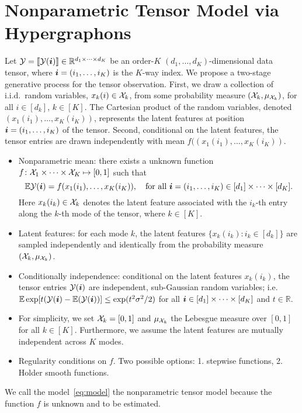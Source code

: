 \documentclass{article}
\theoremstyle{plain}
\theoremstyle{definition}
\begin{document}
\section{Nonparametric Tensor Model via Hypergraphons}\label{sec:model}
Let $\mathcal{Y}=\llbracket \mathcal{Y}(\bm{i}) \rrbracket\in\mathbb{R}^{d_1\times \cdots \times d_K}$ be an order-$K$ $(d_1,\ldots,d_K)$-dimensional data tensor, where $\bm{i}=(i_1,\ldots,i_K)$ is the $K$-way index. We propose a two-stage generative process for the tensor observation. First, we draw a collection of i.i.d.\ random variables, $x_k(i) \in \mathcal{X}_k$, from some probability measure $(\mathcal{X}_k,\mu_{\mathcal{X}_k})$, for all $i\in[d_k]$, $k\in[K]$. The Cartesian product of the random variables, denoted $(x_1(i_1),\ldots,x_K(i_K))$, represents the latent features at position $\bm{i}=(i_1,\dots,i_K)$ of the tensor. Second, conditional on the latent features, the tensor entries are drawn independently with mean $f((x_1(i_1),\ldots,x_K(i_K))$.
\begin{itemize}[label=\textbullet, leftmargin=*]
\item Nonparametric mean: there exists a unknown function $f\colon \mathcal{X}_1\times \cdots \times \mathcal{X}_K \mapsto [0,1]$ such that
\begin{equation}\label{eq:model}
\mathbb{E}\tY(\mi) =f(x_1(i_1),\ldots,x_K(i_K)),\quad \text{for all}\ \mi=(i_1,\ldots,i_K)\in[d_1]\times \cdots \times [d_K].
\end{equation}
Here $x_k(i_k)\in\mathcal{X}_k$ denotes the latent feature associated with the $i_k$-th entry along the $k$-th mode of the tensor, where $k\in[K]$.  
\item Latent features: for each mode $k$, the latent features $\{x_k(i_k)\colon i_k\in[d_k]\}$ are sampled independently and identically from the probability measure $(\mathcal{X}_k,\mu_{\mathcal{X}_k})$.
\item Conditionally independence: conditional on the latent features $x_k(i_k)$, the tensor entries $\mathcal{Y}(\bm{i})$ are independent, sub-Gaussian random variables; i.e. $\mathbb{E}\exp [t(\mathcal{Y}(\bm{i})-\mathbb{E}(\mathcal{Y}(\bm{i}))] \leq \exp(t^2\sigma^2/2)$ for all $\bm{i}\in[d_1]\times \cdots \times[d_K]$ and $t\in\mathbb{R}$.

\item For simplicity, we set $\mathcal{X}_k=[0,1]$ and $\mu_{\mathcal{X}_k}$ the Lebesgue measure over $[0,1]$ for all $k\in[K]$. Furthermore, we assume the latent features are mutually independent across $K$ modes.
\item Regularity conditions on $f$. Two possible options: 1. stepwise functions, 2. Holder smooth functions.
\end{itemize}
We call the model~\eqref{eq:model} the nonparametric tensor model because the function $f$ is unknown and to be estimated. 
\end{document}
